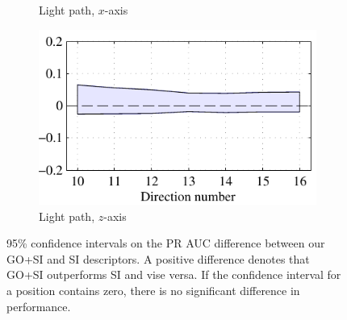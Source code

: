 \documentclass[thesis.tex]{subfiles}
\begin{document}
\begin{figure}[tb]
{\begin{subfigure}[t]{0.6242\textwidth}
		\caption{Light path, $x$-axis}
	\end{subfigure}
	\begin{subfigure}[t]{0.5618\textwidth}
		\includegraphics[width=\textwidth]{img/dtuResultsStatsGoSi_Si_6.pdf}
		\caption{Light path, $z$-axis}
	\end{subfigure}
	}
	\caption{95\% confidence intervals on the PR AUC difference between our GO+SI and SI descriptors. A positive difference denotes that GO+SI outperforms SI and vise versa. If the confidence interval for a position contains zero, there is no significant difference in performance.}
	\label{fig:dtuResultsStatsSi_GoSi}
\end{figure}
\end{document}
